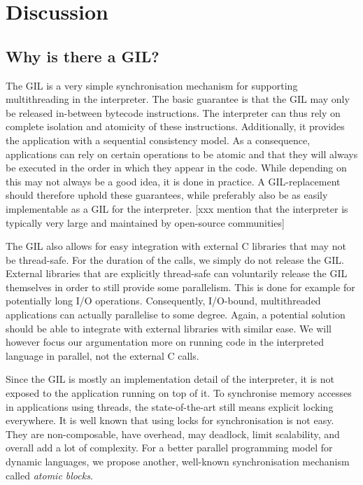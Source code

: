 \documentclass{sigplanconf}
\begin{document}
\section{Discussion}



\subsection{Why is there a GIL?}
The GIL is a very simple synchronisation mechanism for supporting
multithreading in the interpreter. The basic guarantee is that the GIL
may only be released in-between bytecode instructions. The interpreter
can thus rely on complete isolation and atomicity of these
instructions. Additionally, it provides the application with a
sequential consistency model\cite{lamport79}. As a consequence,
applications can rely on certain operations to be atomic and that they
will always be executed in the order in which they appear in the
code. While depending on this may not always be a good idea, it is
done in practice. A GIL-replacement should therefore uphold these
guarantees, while preferably also be as easily implementable as a GIL
for the interpreter.
[xxx mention that the interpreter is typically
  very large and maintained by open-source communities]

The GIL also allows for easy integration with external C libraries that
may not be thread-safe. For the duration of the calls, we
simply do not release the GIL. External libraries that are explicitly
thread-safe can voluntarily release the GIL themselves in order to
still provide some parallelism. This is done for example for
potentially long I/O operations. Consequently, I/O-bound,
multithreaded applications can actually parallelise to some
degree. Again, a potential solution should be able to integrate with
external libraries with similar ease. We will however focus our
argumentation more on running code in the interpreted language in
parallel, not the external C calls.

Since the GIL is mostly an implementation detail of the interpreter,
it is not exposed to the application running on top of it. To
synchronise memory accesses in applications using threads, the
state-of-the-art still means explicit locking everywhere. It is well
known that using locks for synchronisation is not easy.  They are
non-composable, have overhead, may deadlock, limit scalability, and
overall add a lot of complexity. For a better parallel programming
model for dynamic languages, we propose another, well-known
synchronisation mechanism called \emph{atomic blocks}.
\end{document}
